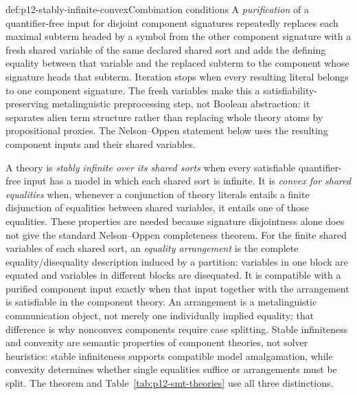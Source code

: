 \begin{hbdefinition}{def:p12-stably-infinite-convex}{Combination conditions}
A \emph{purification} of a quantifier-free input for disjoint component
signatures repeatedly replaces each maximal subterm headed by a symbol from
the other component signature with a fresh shared variable of the same
declared shared sort and adds the defining equality between that variable and
the replaced subterm to the component whose signature heads that subterm.
Iteration stops when every resulting
literal belongs to one component signature.  The fresh variables make this a
satisfiability-preserving metalinguistic preprocessing step, not Boolean
abstraction: it separates alien term structure rather than replacing whole
theory atoms by propositional proxies.  The Nelson--Oppen statement below uses
the resulting component inputs and their shared variables.

A theory is \emph{stably infinite over its shared sorts} when every satisfiable
quantifier-free input has a model in which each shared sort is infinite.  It is
\emph{convex for shared equalities} when, whenever a conjunction of theory
literals entails a finite disjunction of equalities between shared variables,
it entails one of those equalities.  These properties are needed because
signature disjointness alone does not give the standard Nelson--Oppen
completeness theorem.  For the finite shared variables of each shared sort, an
\emph{equality arrangement} is the complete equality/disequality description
induced by a partition: variables in one block are equated and variables in
different blocks are disequated.  It is compatible with a purified component
input exactly when that input together with the arrangement is satisfiable in
the component theory.  An arrangement is a metalinguistic communication
object, not merely one individually implied equality; that difference is why
nonconvex components require case splitting.  Stable infiniteness and
convexity are semantic properties of component theories, not solver
heuristics: stable infiniteness supports compatible model amalgamation, while
convexity determines whether single equalities suffice or arrangements must
be split.  The theorem and Table~\ref{tab:p12-smt-theories} use all three
distinctions.
%
\end{hbdefinition}

